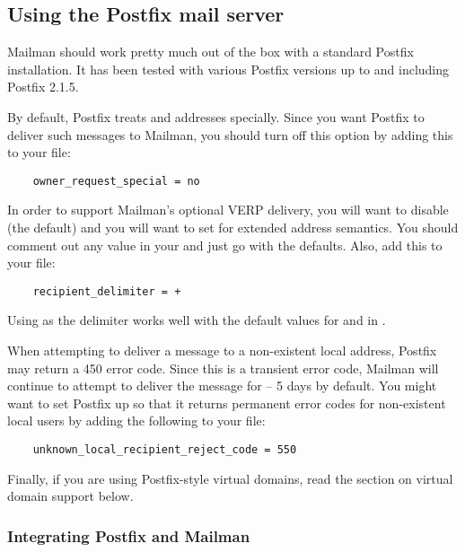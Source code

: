 \documentclass{howto}
\begin{document}
\subsection{Using the Postfix mail server}

Mailman should work pretty much out of the box with a standard Postfix
installation.  It has been tested with various Postfix versions up to and
including Postfix 2.1.5.

By default, Postfix treats  and  addresses
specially.  Since you want Postfix to deliver such messages to Mailman, you
should turn off this option by adding this to your  file:

\begin{verbatim}
    owner_request_special = no
\end{verbatim}

In order to support Mailman's optional VERP delivery, you will want to disable
 (the default) and you will want to set
 for extended address semantics.  You should comment
out any  value in your  and just go with the
defaults.  Also, add this to your  file:

\begin{verbatim}
    recipient_delimiter = +
\end{verbatim}

Using \samp{+} as the delimiter works well with the default values for
 and  in .

When attempting to deliver a message to a non-existent local address, Postfix
may return a 450 error code.  Since this is a transient error code, Mailman
will continue to attempt to deliver the message for
 -- 5 days by default.  You might want to set
Postfix up so that it returns permanent error codes for non-existent local
users by adding the following to your  file:

\begin{verbatim}
    unknown_local_recipient_reject_code = 550
\end{verbatim}

Finally, if you are using Postfix-style virtual domains, read the section on
virtual domain support below.

\subsubsection{Integrating Postfix and Mailman}
\end{document}
